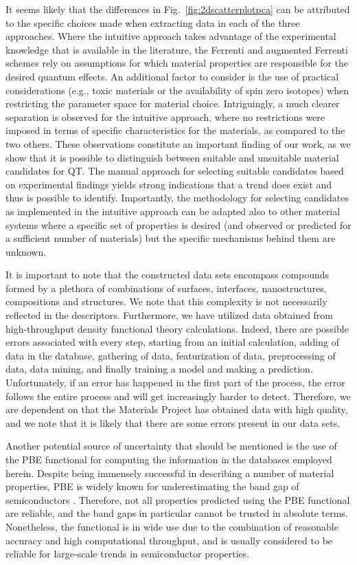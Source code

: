 \documentclass[superscriptaddress,unsortedaddress,
 amsmath,amssymb,
 aps,
]{revtex4-2}
\begin{document}
It seems likely that the differences in Fig.~\ref{fig:2dscatterplotpca} can be attributed to the specific choices made when extracting data in each of the three approaches. Where the intuitive approach takes advantage of the experimental knowledge that is available in the literature, the Ferrenti and augmented Ferrenti schemes rely on assumptions for which material properties are responsible for the desired quantum effects. An additional factor to consider is the use of practical considerations (e.g., toxic materials or the availability of spin zero isotopes) when restricting the parameter space for material choice. 
Intriguingly, a much clearer separation is observed for the intuitive approach, where no restrictions were imposed in terms of specific characteristics for the materials, as compared to the two others. 
These observations constitute an important finding of our work, as we show that it is possible to distinguish between suitable and unsuitable material candidates for QT. The manual approach for selecting suitable candidates based on experimental findings yields strong indications that a trend does exist and thus is possible to identify. 
Importantly, the methodology for selecting candidates as implemented in the intuitive approach can be adapted also to other material systems where a specific set of properties is desired (and observed or predicted for a sufficient number of materials) but the specific mechanisms behind them are unknown. 

It is important to note that the constructed data sets encompass compounds formed by a plethora of combinations of surfaces, interfaces, nanostructures, compositions and structures. We note that this complexity is not necessarily reflected in the descriptors. 
Furthermore, we have utilized data obtained from high-throughput density functional theory calculations. Indeed, there are possible errors associated with every step, starting from an initial calculation, adding of data in the database, gathering of data, featurization of data, preprocessing of data, data mining, and finally training a model and making a prediction. Unfortunately, if an error has happened in the first part of the process, the error follows the entire process and will get increasingly harder to detect. Therefore, we are dependent on that the Materials Project has obtained data with high quality, and we note that it is likely that there are some errors present in our data sets.

Another potential source of uncertainty that should be mentioned is the use of the PBE functional for computing the information in the databases employed herein. Despite being immensely successful in describing a number of material properties, PBE is widely known for underestimating the band gap of semiconductors \cite{Freysoldt2014}. Therefore, not all properties predicted using the PBE functional are reliable, and the band gaps in particular cannot be trusted in absolute terms. Nonetheless, the functional is in wide use due to the combination of reasonable accuracy and high computational throughput, and is usually considered to be reliable for large-scale trends in semiconductor properties. 
\end{document}
